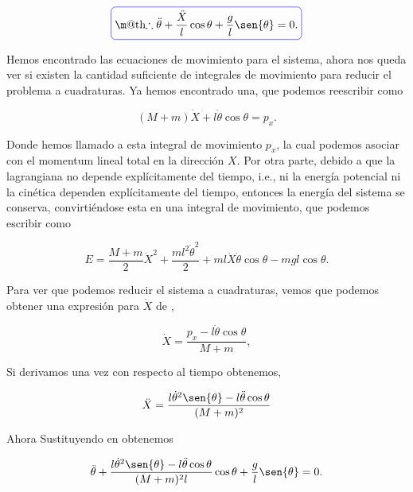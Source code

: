 \documentclass[a4paper,10pt]{article}
\makeatletter
\numberwithin{equation}{section}
\newcommand*{\boxcolor}{blue}
\renewcommand{\boxed}[1]{\textcolor{\boxcolor}{%
\tikz[baseline={([yshift=-1ex]current bounding box.center)}] \node [rectangle, minimum width=1ex,rounded corners,draw] {\normalcolor\m@th$\displaystyle#1$};}}
\makeatother
\begin{document}
\begin{equation}
 \boxed{\therefore \ddot{\theta}  + \frac{\ddot{X}}{l}\cos{\theta} + \frac{g}{l}\sen{\theta} = 0.}
\label{eq:pendudiferential1}
 \end{equation}

Hemos encontrado las ecuaciones de movimiento para el sistema, ahora nos queda ver 
si existen la cantidad suficiente de integrales de movimiento para reducir el problema 
a cuadraturas. Ya hemos encontrado una, que podemos reescribir como

\begin{equation}
 (M + m)\dot{X} + l\dot{\theta} \cos{\theta} = p_x.
 \label{eq:pendu8}
\end{equation}

Donde hemos llamado a esta integral de movimiento $p_x$, la cual podemos asociar con el 
momentum lineal total en la dirección $X$. Por otra parte, debido a que la lagrangiana 
no depende explícitamente del tiempo, i.e., ni la energía potencial ni la cinética dependen 
explícitamente del tiempo, entonces la energía del sistema se conserva, convirtiéndose 
esta en una integral de movimiento, que podemos escribir como

\begin{equation}
  E = \frac{M+m}{2}\dot{X}^2 + \frac{ml^2 \dot{\theta}^2}{2} + 
    ml\dot{X}\dot{\theta}\cos{\theta} - mgl \cos{\theta}.
    \label{eq:pendu9}
\end{equation}

Para ver que podemos reducir el sistema a cuadraturas, vemos que podemos obtener 
una expresión para $\dot{X}$ de ,

\begin{equation}
 \dot{X} = \frac{p_x - l\dot{\theta}\cos{\theta}}{M+m},
 \label{eq:pendu10}
\end{equation}

Si derivamos una vez  con respecto al tiempo obtenemos,

\begin{equation}
 \ddot{X} = \frac{l\dot{\theta}^2\sen{\theta} - l\ddot{\theta}\cos{\theta}}{(M+m)^2}
 \label{eq:pendu11}
 \end{equation}

Ahora Sustituyendo  en  obtenemos

\begin{equation}
 \ddot{\theta}  + \frac{l\dot{\theta}^2\sen{\theta} - l\ddot{\theta}\cos{\theta}}{(M+m)^2l}\cos{\theta} + \frac{g}{l}\sen{\theta} = 0.
\end{equation}
\end{document}
